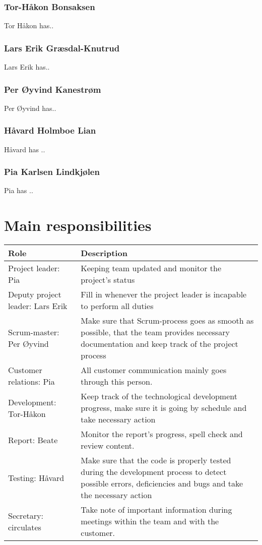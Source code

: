 \documentclass[12pt, oneside]{memoir}
\begin{document}
\subsubsection{Tor-Håkon Bonsaksen}
Tor Håkon has..
\subsubsection{Lars Erik Græsdal-Knutrud}
 Lars Erik has..
\subsubsection{Per Øyvind Kanestrøm}
Per Øyvind has..

\subsubsection{Håvard	Holmboe	Lian}
Håvard has ..
\subsubsection{Pia	Karlsen	Lindkjølen}
Pia has ..

\section{Main responsibilities}
\begin{table}[H]
\begin{tabular}{l|p{7cm}}
\textbf{Role} & \textbf{Description}\\\hline
Project leader: Pia & Keeping team updated and monitor the project's status\\\hline
Deputy project leader: Lars Erik & Fill in whenever the project leader is incapable to perform all duties\\\hline
Scrum-master: Per Øyvind & Make sure that Scrum-process goes as smooth as possible, that the team provides necessary documentation and keep track of the project process\\\hline
Customer relations: Pia & All customer communication mainly goes through this person.\\\hline
Development: Tor-Håkon & Keep track of the technological development progress, make sure it is going by schedule and take necessary action \\\hline
Report: Beate & Monitor the report's progress, spell check and review content.\\\hline
Testing: Håvard & Make sure that the code is properly tested during the development process to detect possible errors, deficiencies and bugs and take the necessary action \\\hline
Secretary: circulates & Take note of important information during meetings within the team and with the customer.
\end{tabular}
\end{table}
\end{document}

